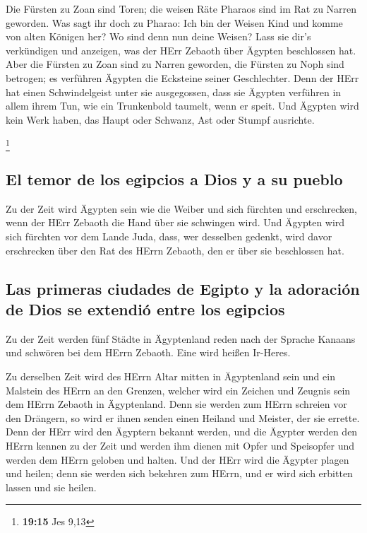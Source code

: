 Die Fürsten zu Zoan sind Toren; die weisen Räte Pharaos
sind im Rat zu Narren geworden. Was sagt ihr doch zu Pharao: Ich bin der
Weisen Kind und komme von alten Königen her?  Wo sind
denn nun deine Weisen? Lass sie dir's verkündigen und anzeigen, was der
HErr Zebaoth über Ägypten beschlossen hat.  Aber die
Fürsten zu Zoan sind zu Narren geworden, die Fürsten zu Noph sind
betrogen; es verführen Ägypten die Ecksteine seiner Geschlechter.
 Denn der HErr hat einen Schwindelgeist unter sie
ausgegossen, dass sie Ägypten verführen in allem ihrem Tun, wie ein
Trunkenbold taumelt, wenn er speit.  Und Ägypten wird
kein Werk haben, das Haupt oder Schwanz, Ast oder Stumpf ausrichte.

\footnote{\textbf{19:15} Jes 9,13}

\hypertarget{el-temor-de-los-egipcios-a-dios-y-a-su-pueblo}{%
\subsection{El temor de los egipcios a Dios y a su
pueblo}\label{el-temor-de-los-egipcios-a-dios-y-a-su-pueblo}}

 Zu der Zeit wird Ägypten sein wie die Weiber und sich
fürchten und erschrecken, wenn der HErr Zebaoth die Hand über sie
schwingen wird.  Und Ägypten wird sich fürchten vor dem
Lande Juda, dass, wer desselben gedenkt, wird davor erschrecken über den
Rat des HErrn Zebaoth, den er über sie beschlossen hat.

\hypertarget{las-primeras-ciudades-de-egipto-y-la-adoraciuxf3n-de-dios-se-extendiuxf3-entre-los-egipcios}{%
\subsection{Las primeras ciudades de Egipto y la adoración de Dios se
extendió entre los
egipcios}\label{las-primeras-ciudades-de-egipto-y-la-adoraciuxf3n-de-dios-se-extendiuxf3-entre-los-egipcios}}

 Zu der Zeit werden fünf Städte in Ägyptenland reden nach
der Sprache Kanaans und schwören bei dem HErrn Zebaoth. Eine wird heißen
Ir-Heres.

 Zu derselben Zeit wird des HErrn Altar mitten in
Ägyptenland sein und ein Malstein des HErrn an den Grenzen,
 welcher wird ein Zeichen und Zeugnis sein dem HErrn
Zebaoth in Ägyptenland. Denn sie werden zum HErrn schreien vor den
Drängern, so wird er ihnen senden einen Heiland und Meister, der sie
errette.  Denn der HErr wird den Ägyptern bekannt werden,
und die Ägypter werden den HErrn kennen zu der Zeit und werden ihm
dienen mit Opfer und Speisopfer und werden dem HErrn geloben und halten.
 Und der HErr wird die Ägypter plagen und heilen; denn
sie werden sich bekehren zum HErrn, und er wird sich erbitten lassen und
sie heilen.

